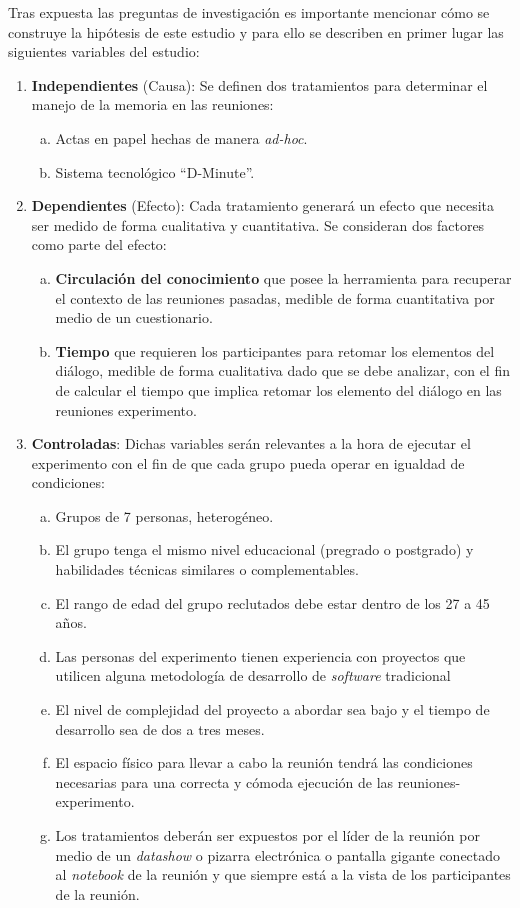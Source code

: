 Tras expuesta las preguntas de investigación es importante mencionar cómo se construye la hipótesis de este estudio y para ello se describen en primer lugar  las siguientes variables del estudio: 

\begin{enumerate}[1.]
    \item \textbf{Independientes} (Causa): Se definen dos tratamientos para determinar el manejo de la memoria en las reuniones: 
    \begin{enumerate}[a.]
	    \item Actas en papel hechas de manera \textit{ad-hoc}. 
		\item Sistema tecnológico “D-Minute”.
    \end{enumerate}

    \item \textbf{Dependientes} (Efecto): Cada tratamiento generará un efecto que necesita ser medido de forma cualitativa y cuantitativa. Se consideran dos factores como parte del efecto:
    \begin{enumerate}[a.]
	    \item \textbf{Circulación del conocimiento} que posee la herramienta para recuperar el contexto de las reuniones pasadas, medible de forma cuantitativa por medio de un cuestionario.
	    \item \textbf{Tiempo} que requieren los participantes para retomar los elementos del diálogo, medible de forma cualitativa dado que se debe analizar, con el fin de calcular el tiempo que implica retomar los elemento del diálogo en las reuniones experimento.
    \end{enumerate}

    \item \textbf{Controladas}: Dichas variables serán relevantes a la hora de ejecutar el experimento con el fin de que cada grupo pueda operar en igualdad de condiciones:
    \begin{enumerate}[a.]
	    \item Grupos de 7 personas, heterogéneo.
	    \item El grupo tenga el mismo nivel educacional (pregrado o postgrado) y habilidades técnicas similares o complementables.
	    \item El rango de edad del grupo reclutados debe estar dentro de los 27 a 45 años.
	    \item Las personas del experimento tienen experiencia con proyectos que utilicen alguna metodología de desarrollo de \textit{software} tradicional
	    \item El nivel de complejidad del proyecto a abordar sea bajo y el tiempo de desarrollo sea de dos a tres meses.
	    \item El espacio físico para llevar a cabo la reunión tendrá las condiciones necesarias para una correcta y cómoda ejecución de las reuniones-experimento.
	    \item Los tratamientos deberán ser expuestos por el líder de la reunión por medio de un \textit{datashow} o pizarra electrónica o pantalla gigante conectado al \textit{notebook} de la reunión y que siempre está a la vista de los participantes de la reunión.
    \end{enumerate}


\end{enumerate}
